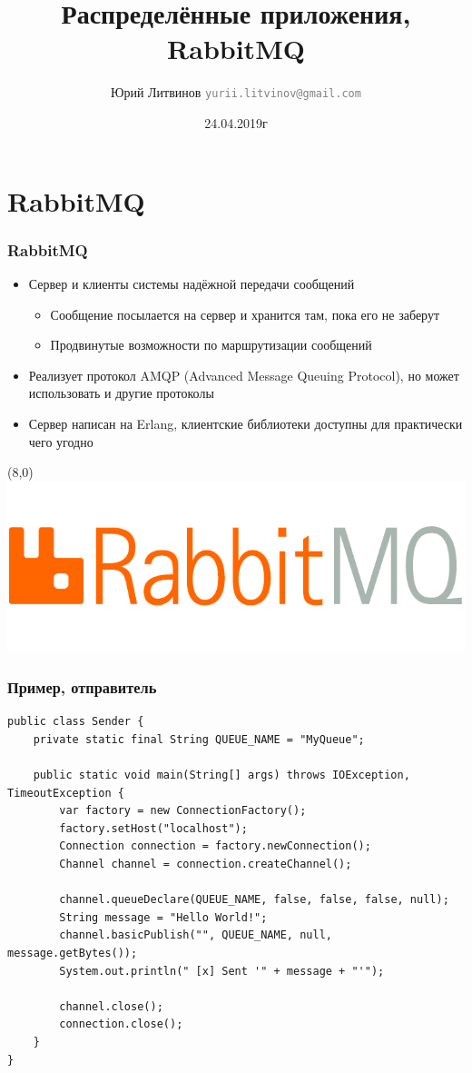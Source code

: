 \documentclass[xetex,mathserif,serif]{beamer}
\title{Распределённые приложения, RabbitMQ}
\author[Юрий Литвинов]{Юрий Литвинов \newline \textcolor{gray}{\small\texttt{yurii.litvinov@gmail.com}}}
\date{24.04.2019г}
\begin{document}
	\frame{\titlepage}

	\section{RabbitMQ}

	\begin{frame}
		\frametitle{RabbitMQ}
		\begin{itemize}
			\item Сервер и клиенты системы надёжной передачи сообщений
			\begin{itemize}
				\item Сообщение посылается на сервер и хранится там, пока его не заберут
				\item Продвинутые возможности по маршрутизации сообщений
			\end{itemize}
			\item Реализует протокол AMQP (Advanced Message Queuing Protocol), но может использовать и другие протоколы
			\item Сервер написан на Erlang, клиентские библиотеки доступны для практически чего угодно
		\end{itemize}
		\begin{textblock}{3}(8,0)
			\includegraphics[width=\textwidth]{rabbitmqLogo.png}
		\end{textblock}
	\end{frame}

	\begin{frame}[fragile]
		\frametitle{Пример, отправитель}
		\begin{ssmall}
			\begin{verbatim}
public class Sender {
    private static final String QUEUE_NAME = "MyQueue";

    public static void main(String[] args) throws IOException, TimeoutException {
        var factory = new ConnectionFactory();
        factory.setHost("localhost");
        Connection connection = factory.newConnection();
        Channel channel = connection.createChannel();

        channel.queueDeclare(QUEUE_NAME, false, false, false, null);
        String message = "Hello World!";
        channel.basicPublish("", QUEUE_NAME, null, message.getBytes());
        System.out.println(" [x] Sent '" + message + "'");

        channel.close();
        connection.close();
    }
}
			\end{verbatim}
		\end{ssmall}
	\end{frame}
\end{document}
